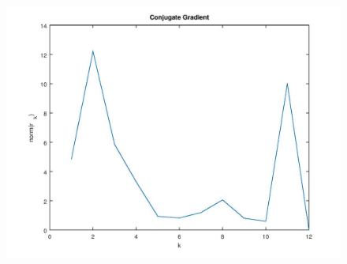 \documentclass[10pt]{article}
\begin{document}
\begin{figure}[!ht]
\includegraphics[width=\textwidth]{test-2.jpg}
\end{figure}
\end{document}
